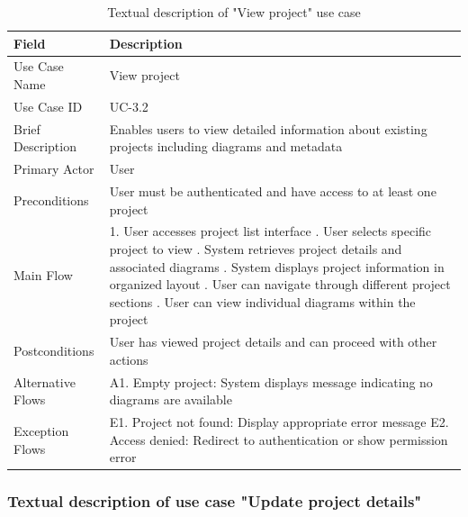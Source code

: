 \begin{table}[H]
\centering
\caption{Textual description of "View project" use case}
\label{tab:view_project_usecase}
\begin{tabular}{|p{3cm}|p{10cm}|}
\hline
\textbf{Field} & \textbf{Description} \\
\hline
Use Case Name & View project \\
\hline
Use Case ID & UC-3.2 \\
\hline
Brief Description & Enables users to view detailed information about existing projects including diagrams and metadata \\
\hline
Primary Actor & User \\
\hline
Preconditions & User must be authenticated and have access to at least one project \\
\hline
Main Flow & 1. User accesses project list interface \newline 2. User selects specific project to view \newline 3. System retrieves project details and associated diagrams \newline 4. System displays project information in organized layout \newline 5. User can navigate through different project sections \newline 6. User can view individual diagrams within the project \\
\hline
Postconditions & User has viewed project details and can proceed with other actions \\
\hline
Alternative Flows & A1. Empty project: System displays message indicating no diagrams are available \\
\hline
Exception Flows & E1. Project not found: Display appropriate error message \newline E2. Access denied: Redirect to authentication or show permission error \\
\hline
\end{tabular}
\end{table}

\subsubsection{Textual description of use case "Update project details"}

